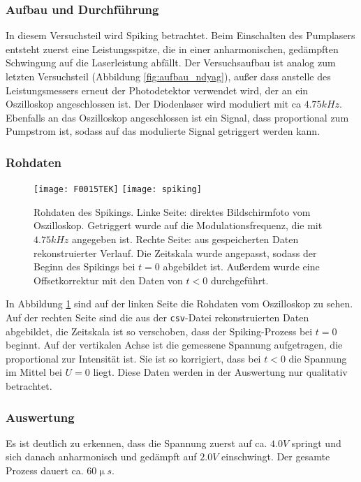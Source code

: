 \documentclass{../Misc/MontavonLaTeX/Montavon}
\newcommand{\halfwidth}{0.48\textwidth}
\begin{document}
\subsubsection{Aufbau und Durchführung}
In diesem Versuchsteil wird Spiking betrachtet. Beim Einschalten des Pumplasers entsteht zuerst eine Leistungsspitze, die in einer anharmonischen, gedämpften Schwingung auf die Laserleistung abfällt. 
Der Versuchsaufbau ist analog zum letzten Versuchsteil (Abbildung \ref{fig:aufbau_ndyag}), außer dass anstelle des Leistungsmessers erneut der Photodetektor verwendet wird, der an ein Oszilloskop angeschlossen ist. Der Diodenlaser wird moduliert mit ca $4.75 \unit{kHz}$. 
Ebenfalls an das Oszilloskop angeschlossen ist ein Signal, dass proportional zum Pumpstrom ist, sodass auf das modulierte Signal getriggert werden kann.

\subsubsection{Rohdaten}
\begin{figure}
\centering
\texttt{[image: F0015TEK]}
\texttt{[image: spiking]}
\caption{Rohdaten des Spikings. Linke Seite: direktes Bildschirmfoto vom Oszilloskop. Getriggert wurde auf die Modulationsfrequenz, die mit $4.75 \unit{kHz}$ angegeben ist. Rechte Seite: aus gespeicherten Daten rekonstruierter Verlauf. Die Zeitskala wurde angepasst, sodass der Beginn des Spikings bei $t = 0$ abgebildet ist. Außerdem wurde eine Offsetkorrektur mit den Daten von $t < 0$ durchgeführt.}
\label{fig:spiking}
\end{figure}

In Abbildung \ref{fig:spiking} sind auf der linken Seite die Rohdaten vom Oszilloskop zu sehen. Auf der rechten Seite sind die aus der \texttt{csv}-Datei rekonstruierten Daten abgebildet, die Zeitskala ist so verschoben, dass der Spiking-Prozess bei $t = 0$ beginnt. Auf der vertikalen Achse ist die gemessene Spannung aufgetragen, die proportional zur Intensität ist. Sie ist so korrigiert, dass bei $t < 0$ die Spannung im Mittel bei $U = 0$ liegt.
Diese Daten werden in der Auswertung nur qualitativ betrachtet.

\subsubsection{Auswertung}
Es ist deutlich zu erkennen, dass die Spannung zuerst auf ca. $4.0 \unit{V}$ springt und sich danach anharmonisch und gedämpft auf $2.0 \unit{V}$ einschwingt. Der gesamte Prozess dauert ca. $60 \unit{\upmu s}$.
\end{document}
